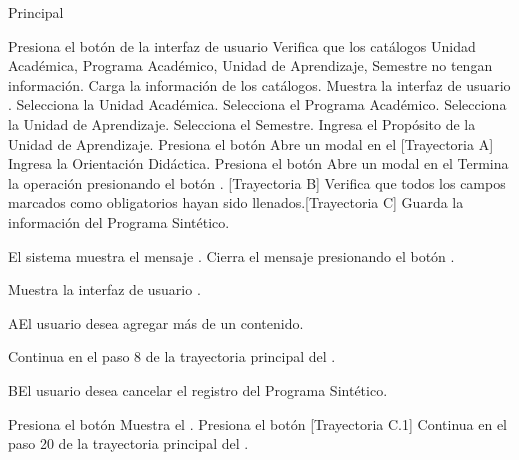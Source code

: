 \begin{UCtrayectoria}{Principal}

    \UCpaso[\UCactor] Presiona el botón  de la interfaz de usuario 
    \UCpaso Verifica que los catálogos Unidad Académica, Programa Académico, Unidad de Aprendizaje, Semestre no tengan información.
    \UCpaso Carga la información de los catálogos.
    \UCpaso Muestra la interfaz de usuario .
    \UCpaso[\UCactor] Selecciona la Unidad Académica.
    \UCpaso[\UCactor] Selecciona el Programa Académico.
    \UCpaso[\UCactor] Selecciona la Unidad de Aprendizaje.
    \UCpaso[\UCactor] Selecciona el Semestre.
    \UCpaso[\UCactor] Ingresa el Propósito de la Unidad de Aprendizaje.
    \UCpaso[\UCactor] Presiona el botón 
    \UCpaso Abre un modal en el  [Trayectoria A]
    \UCpaso[\UCactor] Ingresa la Orientación Didáctica.
    \UCpaso[\UCactor] Presiona el botón 
    \UCpaso Abre un modal en el 
    \UCpaso[\UCactor] Termina la operación presionando el botón . [Trayectoria B]
    \UCpaso Verifica que todos los campos marcados como obligatorios hayan sido llenados.[Trayectoria C]
    \UCpaso Guarda la información del Programa Sintético.

    \UCpaso El sistema muestra el mensaje .
    \UCpaso[\UCactor] Cierra el mensaje presionando el botón .



    \UCpaso Muestra la interfaz de usuario .
\end{UCtrayectoria}


\begin{UCtrayectoriaA}{A}{El usuario desea agregar más de un contenido.}

    \UCpaso Continua en el paso 8 de la trayectoria principal del .

\end{UCtrayectoriaA}

\begin{UCtrayectoriaA}{B}{El usuario desea cancelar el registro del Programa Sintético.}

    \UCpaso[\UCactor] Presiona el botón 
    \UCpaso Muestra el .
    \UCpaso[\UCactor] Presiona el botón  [Trayectoria C.1]
    \UCpaso Continua en el paso 20 de la trayectoria principal del .

\end{UCtrayectoriaA}

